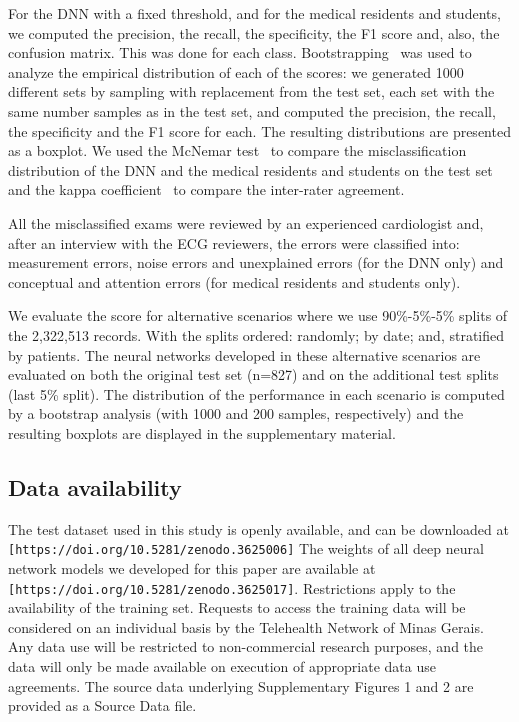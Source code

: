 \documentclass{article}
\begin{document}
For the DNN with a fixed threshold, and for the medical residents and students, we computed the precision, the recall, the specificity, the F1 score and, also, the confusion matrix. This was done for each class. Bootstrapping~\cite{efron_introduction_1994} was used to analyze the empirical distribution of each of the scores: we generated 1000 different sets by sampling  with replacement from the test set, each set with the same number samples as in the test set, and computed the precision, the recall, the specificity and the F1 score for each. The resulting distributions are presented as a boxplot. We used the McNemar test~\cite{mcnemar_note_1947} to compare the misclassification distribution of the DNN and the medical residents and students on the test set and the kappa coefficient~\cite{cohen_coefficient_1960} to compare the inter-rater agreement.

All the misclassified exams were reviewed by an experienced cardiologist and, after an interview with the ECG reviewers, the errors were classified into: measurement errors, noise errors and unexplained errors (for the DNN only) and conceptual and attention errors (for medical residents and students only).


We evaluate the  score for alternative scenarios where we use 90\%-5\%-5\% splits of the 2,322,513 records. With the splits ordered: randomly; by date; and, stratified by patients. The neural networks developed in these alternative scenarios are evaluated on both the original test set (n=827) and on the additional test splits (last 5\% split).  The distribution of the performance in each scenario is computed by a bootstrap analysis (with 1000 and 200 samples, respectively) and the resulting boxplots are displayed in the supplementary material.

\subsection*{Data availability} The test dataset used in this study is openly available, and can be downloaded at\\ 
\verb|[https://doi.org/10.5281/zenodo.3625006]| The weights of all deep neural network models we developed for this paper are  available at \verb|[https://doi.org/10.5281/zenodo.3625017]|. Restrictions apply to the availability of the training set. Requests to access the training data will be considered on an individual basis by the Telehealth Network of Minas Gerais. Any data use will be restricted to non-commercial research purposes, and the data will only be made available on execution of appropriate data use agreements. The source data underlying Supplementary Figures 1 and 2 are provided as a Source Data file.
\end{document}
